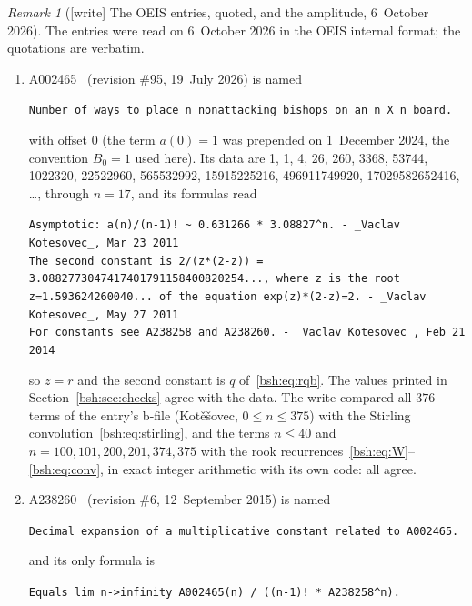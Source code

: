 \documentclass[11pt,letterpaper]{article}
\theoremstyle{remark}\newtheorem{remark}[theorem]{Remark}
\begin{document}
\begin{remark}[{[write]} The OEIS entries, quoted, and the amplitude, 6~October 2026]\label{bsh:rem:oeis}
The entries were read on 6~October 2026 in the OEIS internal format; the
quotations are verbatim.
\begin{enumerate}[label=(\alph*)]
\item A002465~\cite{oeisbishops} (revision \#95, 19~July 2026) is named
 \begin{center}\small
 \parbox{0.92\textwidth}{\raggedright\texttt{Number of ways to place n nonattacking bishops on an n X n board.}}
 \end{center}
 with offset $0$ (the term $a(0)=1$ was prepended on
 1~December 2024, the convention $B_0=1$ used here). Its data are
 1, 1, 4, 26, 260, 3368, 53744, 1022320, 22522960, 565532992,
 15915225216, 496911749920, 17029582652416, \dots, through $n=17$, and its
 formulas read
 \begin{center}\small
 \parbox{0.92\textwidth}{\raggedright\texttt{Asymptotic: a(n)/(n-1)! \textasciitilde{} 0.631266 * 3.08827\^{}n. - \_Vaclav Kotesovec\_, Mar 23 2011}\\
 \texttt{The second constant is 2/(z*(2-z)) = 3.0882773047417401791158400820254..., where z is the root z=1.593624260040... of the equation exp(z)*(2-z)=2. - \_Vaclav Kotesovec\_, May 27 2011}\\
 \texttt{For constants see A238258 and A238260. - \_Vaclav Kotesovec\_, Feb 21 2014}}
 \end{center}
 so $z=r$ and the second constant is $q$ of~\eqref{bsh:eq:rqb}. The values
 printed in Section~\ref{bsh:sec:checks} agree with the data. The write
 compared all $376$ terms of the entry's b-file (Kot\v e\v sovec, $0\le
 n\le375$) with the Stirling convolution~\eqref{bsh:eq:stirling}, and the
 terms $n\le40$ and $n=100,101,200,201,374,375$ with the rook
 recurrences~\eqref{bsh:eq:W}--\eqref{bsh:eq:conv}, in exact integer
 arithmetic with its own code: all agree.
\item A238260~\cite{oeisconstant} (revision \#6, 12~September 2015) is named
 \begin{center}\small
 \parbox{0.92\textwidth}{\raggedright\texttt{Decimal expansion of a multiplicative constant related to A002465.}}
 \end{center}
 and its only formula is
 \begin{center}\small
 \parbox{0.92\textwidth}{\raggedright\texttt{Equals lim n->infinity A002465(n) / ((n-1)! * A238258\^{}n).}}
 \end{center}

\end{enumerate}
\end{remark}
\end{document}
